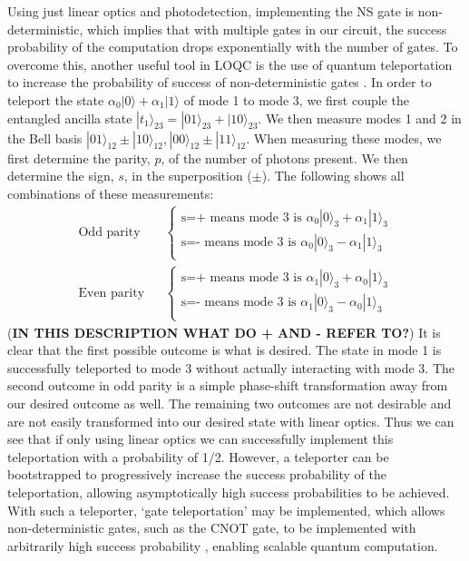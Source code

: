 \documentclass[aps,pra,twocolumn,amsmath,amssymb,nofootinbib,superscriptaddress]{revtex4}
\newcommand{\ket}[1]{|#1\rangle}
\begin{document}
Using just linear optics and photodetection, implementing the NS gate is non-deterministic, which implies that with multiple gates in our circuit, the success probability of the computation drops exponentially with the number of gates. To overcome this, another useful tool in LOQC is the use of quantum teleportation to increase the probability of success of non-deterministic gates \cite{knill}. In order to teleport the state $\alpha_0 \ket{0} + \alpha_1 \ket{1}$ of mode 1 to mode 3, we first couple the entangled ancilla state $\ket{t_1}_{23} = \ket{01}_{23} + \ket{10}_{23}$. We then measure modes 1 and 2 in the Bell basis $\ket{01}_{12} \pm \ket{10}_{12}, \ket{00}_{12} \pm \ket{11}_{12}$. When measuring these modes, we first determine the parity, $p$, of the number of photons present. We then determine the sign, $s$, in the superposition ($\pm$). The following shows all combinations of these measurements:
\begin{eqnarray}
\textrm{Odd parity} && \left \{
\begin{array}{c}
\textrm{s=+ means mode 3 is  } \alpha_0 \ket{0}_3 + \alpha_1 \ket{1}_3  \\
\textrm{s=- means mode 3 is  } \alpha_0 \ket{0}_3 - \alpha_1 \ket{1}_3 \\
\end{array} \right . \nonumber\\
\textrm{Even parity} && \left \{
\begin{array}{c}
\textrm{s=+ means mode 3 is  } \alpha_1 \ket{0}_3 + \alpha_0 \ket{1}_3 \\
\textrm{s=- means mode 3 is  } \alpha_1 \ket{0}_3 - \alpha_0 \ket{1}_3 \\
\end{array} \right . \nonumber
\end{eqnarray}
(\textbf{IN THIS DESCRIPTION WHAT DO + AND - REFER TO?}) It is clear that the first possible outcome is what is desired. The state in mode 1 is successfully teleported to mode 3 without actually interacting with mode 3. The second outcome in odd parity is a simple phase-shift transformation away from our desired outcome as well. The remaining two outcomes are not desirable and are not easily transformed into our desired state with linear optics. Thus we can see that if only using linear optics we can successfully implement this teleportation with a probability of 1/2. However, a teleporter can be bootstrapped to progressively increase the success probability of the teleportation, allowing asymptotically high success probabilities to be achieved. With such a teleporter, `gate teleportation' may be implemented, which allows non-deterministic gates, such as the CNOT gate, to be implemented with arbitrarily high success probability \cite{knill}, enabling scalable quantum computation.
\end{document}
